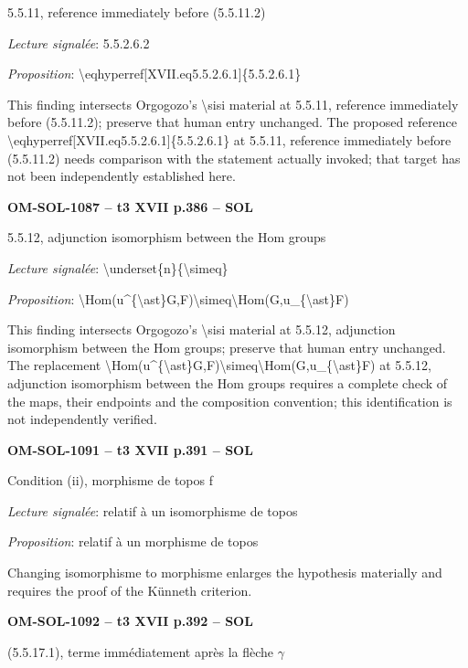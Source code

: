 5.5.11, reference immediately before (5.5.11.2)\par
\emph{Lecture signalée}: 5.5.2.6.2\par
\emph{Proposition}: \textbackslash{}eqhyperref[XVII.eq5.5.2.6.1]\{5.5.2.6.1\}\par
This finding intersects Orgogozo's \textbackslash{}sisi material at 5.5.11, reference immediately before (5.5.11.2); preserve that human entry unchanged. The proposed reference \textbackslash{}eqhyperref[XVII.eq5.5.2.6.1]\{5.5.2.6.1\} at 5.5.11, reference immediately before (5.5.11.2) needs comparison with the statement actually invoked; that target has not been independently established here.\par
\par\noindent\textbf{OM-SOL-1087 -- t3 XVII p.386 -- SOL}\par
5.5.12, adjunction isomorphism between the Hom groups\par
\emph{Lecture signalée}: \textbackslash{}underset\{n\}\{\textbackslash{}simeq\}\par
\emph{Proposition}: \textbackslash{}Hom(u\textasciicircum{}\{\textbackslash{}ast\}G,F)\textbackslash{}simeq\textbackslash{}Hom(G,u\_\{\textbackslash{}ast\}F)\par
This finding intersects Orgogozo's \textbackslash{}sisi material at 5.5.12, adjunction isomorphism between the Hom groups; preserve that human entry unchanged. The replacement \textbackslash{}Hom(u\textasciicircum{}\{\textbackslash{}ast\}G,F)\textbackslash{}simeq\textbackslash{}Hom(G,u\_\{\textbackslash{}ast\}F) at 5.5.12, adjunction isomorphism between the Hom groups requires a complete check of the maps, their endpoints and the composition convention; this identification is not independently verified.\par
\par\noindent\textbf{OM-SOL-1091 -- t3 XVII p.391 -- SOL}\par
Condition (ii), morphisme de topos f\par
\emph{Lecture signalée}: relatif à un isomorphisme de topos\par
\emph{Proposition}: relatif à un morphisme de topos\par
Changing isomorphisme to morphisme enlarges the hypothesis materially and requires the proof of the Künneth criterion.\par
\par\noindent\textbf{OM-SOL-1092 -- t3 XVII p.392 -- SOL}\par
(5.5.17.1), terme immédiatement après la flèche \ensuremath{\gamma}\par
